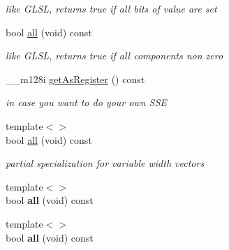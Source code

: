 \begin{DoxyCompactItemize}
\begin{DoxyCompactList}\small\item\em like G\+L\+SL, returns true if all bits of value are set \end{DoxyCompactList}\item 
bool \hyperlink{classirr_1_1core_1_1vectorSIMDBool_ab192a5d96487ecc7cfaa549ad42ede8d}{all} (void) const \hypertarget{classirr_1_1core_1_1vectorSIMDBool_ab192a5d96487ecc7cfaa549ad42ede8d}{}\label{classirr_1_1core_1_1vectorSIMDBool_ab192a5d96487ecc7cfaa549ad42ede8d}

\begin{DoxyCompactList}\small\item\em like G\+L\+SL, returns true if all components non zero \end{DoxyCompactList}\item 
\+\_\+\+\_\+m128i \hyperlink{classirr_1_1core_1_1vectorSIMDBool_a9cc4f69d33c83a4829492cf6c8984b3d}{get\+As\+Register} () const \hypertarget{classirr_1_1core_1_1vectorSIMDBool_a9cc4f69d33c83a4829492cf6c8984b3d}{}\label{classirr_1_1core_1_1vectorSIMDBool_a9cc4f69d33c83a4829492cf6c8984b3d}

\begin{DoxyCompactList}\small\item\em in case you want to do your own S\+SE \end{DoxyCompactList}\item 
{\footnotesize template$<$$>$ }\\bool \hyperlink{classirr_1_1core_1_1vectorSIMDBool_a45123182d43ae3886d3368a1ea2c61b9}{all} (void) const\hypertarget{classirr_1_1core_1_1vectorSIMDBool_a45123182d43ae3886d3368a1ea2c61b9}{}\label{classirr_1_1core_1_1vectorSIMDBool_a45123182d43ae3886d3368a1ea2c61b9}

\begin{DoxyCompactList}\small\item\em partial specialization for variable width vectors \end{DoxyCompactList}\item 
{\footnotesize template$<$$>$ }\\bool {\bfseries all} (void) const\hypertarget{classirr_1_1core_1_1vectorSIMDBool_ac994df18692fb353f4105ae90a87c4c6}{}\label{classirr_1_1core_1_1vectorSIMDBool_ac994df18692fb353f4105ae90a87c4c6}

\item 
{\footnotesize template$<$$>$ }\\bool {\bfseries all} (void) const\hypertarget{classirr_1_1core_1_1vectorSIMDBool_a73c22d028ee77a1acdbf1921761c34b5}{}\label{classirr_1_1core_1_1vectorSIMDBool_a73c22d028ee77a1acdbf1921761c34b5}


\end{DoxyCompactItemize}
